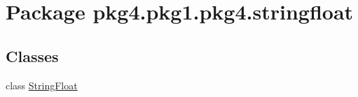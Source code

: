 \hypertarget{namespacepkg4_1_1pkg1_1_1pkg4_1_1stringfloat}{}\section{Package pkg4.\+pkg1.\+pkg4.\+stringfloat}
\label{namespacepkg4_1_1pkg1_1_1pkg4_1_1stringfloat}
\subsection*{Classes}
\begin{DoxyCompactItemize}
\item 
class \mbox{\hyperlink{classpkg4_1_1pkg1_1_1pkg4_1_1stringfloat_1_1_string_float}{String\+Float}}
\end{DoxyCompactItemize}
